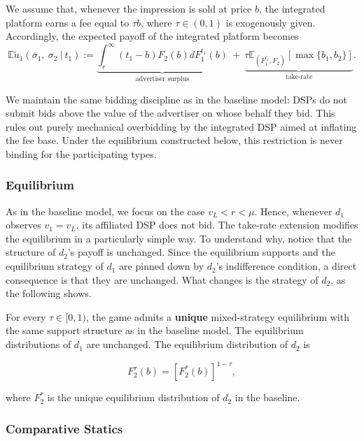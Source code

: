 We assume that, whenever the impression is sold at price $ b $, the integrated platform earns a fee equal to $ \tau b $, where $ \tau \in (0,1) $ is exogenously given. Accordingly, the expected payoff of the integrated platform becomes
\begin{equation*}
 \mathbb{E}\tilde{u}_1 \left( \overline{\sigma}_1, \ \sigma_2 \ \big| \ t_1  \right) := \underbrace{\int_{r}^{\infty} (t_1 - b) F_2(b) d F_1^{t_1}(b)}_\text{advertiser surplus} \ + \ \underbrace{\tau \mathbb{E}_{\left({F_1^{t_1}, F_2}\right)} [\max \{ b_1, b_2 \}]}_\text{take-rate}.
\end{equation*}

We maintain the same bidding discipline as in the baseline model: DSPs do not submit bids above the value of the advertiser on whose behalf they bid. This rules out purely mechanical overbidding by the integrated DSP aimed at inflating the fee base. Under the equilibrium constructed below, this restriction is never binding for the participating types.

\subsubsection{Equilibrium}

As in the baseline model, we focus on the case $ v_L < r < \mu $. Hence, whenever $ d_1 $ observes $ v_1 = v_L$, its affiliated DSP does not bid. The take-rate extension modifies the equilibrium in a particularly simple way. To understand why, notice that the structure of $ d_2 $'s payoff is unchanged. Since the equilibrium supports and the equilibrium strategy of $ d_1 $ are pinned down by $ d_2 $'s indifference condition, a direct consequence is that they are unchanged. What changes is the strategy of $ d_2 $, as the following shows.

\begin{prop}
For every $ \tau\in[0,1) $, the game admits a \textbf{unique} mixed-strategy equilibrium with the same support structure as in the baseline model. The equilibrium distributions of $ d_1 $ are unchanged. The equilibrium distribution of $ d_2 $ is

\[
F_2^\tau(b)=\left[F_2^*(b)\right]^{1-\tau},
\]

\noindent where $ F_2^* $ is the unique equilibrium distribution of $ d_2 $ in the baseline.
\end{prop}

\subsubsection{Comparative Statics}

